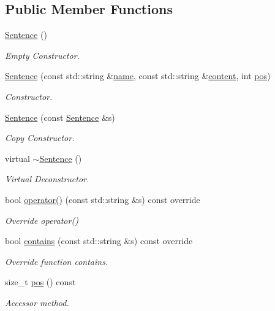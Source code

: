 \subsection*{Public Member Functions}
\begin{DoxyCompactItemize}
\item 
\hyperlink{class_sentence_aa767c3de8aaf7f2e30fa7524cdfcaead}{Sentence} ()
\begin{DoxyCompactList}\small\item\em Empty Constructor. \end{DoxyCompactList}\item 
\hyperlink{class_sentence_af493870ce2b1718f57a979319af9e7a7}{Sentence} (const std\+::string \&\hyperlink{class_index_item_a059cbae312c51ae7d02050f8f325bf93}{name}, const std\+::string \&\hyperlink{class_index_item_aab7965cbd4a573ebf120ee6bad9a7fbf}{content}, int \hyperlink{class_sentence_af98c9ff5c5be578e7e45057ebd9b899b}{pos})
\begin{DoxyCompactList}\small\item\em Constructor. \end{DoxyCompactList}\item 
\mbox{\label{class_sentence_a66492f63af03eabbb7b0faa10ab8b85e}} 
\hyperlink{class_sentence_a66492f63af03eabbb7b0faa10ab8b85e}{Sentence} (const \hyperlink{class_sentence}{Sentence} \&s)
\begin{DoxyCompactList}\small\item\em Copy Constructor. \end{DoxyCompactList}\item 
\mbox{\label{class_sentence_a27635745fc2f7328c75c299e4f382a10}} 
virtual \hyperlink{class_sentence_a27635745fc2f7328c75c299e4f382a10}{$\sim$\+Sentence} ()
\begin{DoxyCompactList}\small\item\em Virtual Deconstructor. \end{DoxyCompactList}\item 
bool \hyperlink{class_sentence_aacbd8da0eeadd6a544f00c7ea4169c79}{operator()} (const std\+::string \&s) const override
\begin{DoxyCompactList}\small\item\em Override operator() \end{DoxyCompactList}\item 
bool \hyperlink{class_sentence_a867c17dbf3ef55c8708faa120ffad162}{contains} (const std\+::string \&s) const override
\begin{DoxyCompactList}\small\item\em Override function contains. \end{DoxyCompactList}\item 
size\+\_\+t \hyperlink{class_sentence_af98c9ff5c5be578e7e45057ebd9b899b}{pos} () const
\begin{DoxyCompactList}\small\item\em Accessor method. \end{DoxyCompactList}\end{DoxyCompactItemize}
